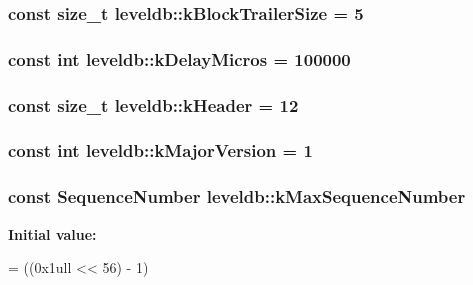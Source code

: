 \subsubsection[{k\+Block\+Trailer\+Size}]{\setlength{\rightskip}{0pt plus 5cm}const size\+\_\+t leveldb\+::k\+Block\+Trailer\+Size = 5\hspace{0.3cm}{\ttfamily [static]}}\label{namespaceleveldb_a4f00b102aae97cb0b0418b6f703a577e}
\hypertarget{namespaceleveldb_a5534e21c4b10affbe7390a9642ac0668}{}
\subsubsection[{k\+Delay\+Micros}]{\setlength{\rightskip}{0pt plus 5cm}const int leveldb\+::k\+Delay\+Micros = 100000\hspace{0.3cm}{\ttfamily [static]}}\label{namespaceleveldb_a5534e21c4b10affbe7390a9642ac0668}
\hypertarget{namespaceleveldb_a0c307b86a9e098703aa8aa0a55ce504a}{}
\subsubsection[{k\+Header}]{\setlength{\rightskip}{0pt plus 5cm}const size\+\_\+t leveldb\+::k\+Header = 12\hspace{0.3cm}{\ttfamily [static]}}\label{namespaceleveldb_a0c307b86a9e098703aa8aa0a55ce504a}
\hypertarget{namespaceleveldb_ab5f58e0e9055bf647e6b92dc8b69c11f}{}
\subsubsection[{k\+Major\+Version}]{\setlength{\rightskip}{0pt plus 5cm}const int leveldb\+::k\+Major\+Version = 1\hspace{0.3cm}{\ttfamily [static]}}\label{namespaceleveldb_ab5f58e0e9055bf647e6b92dc8b69c11f}
\hypertarget{namespaceleveldb_adf59027c8c0dcc54c9d8c3e5ba090463}{}
\subsubsection[{k\+Max\+Sequence\+Number}]{\setlength{\rightskip}{0pt plus 5cm}const {\bf Sequence\+Number} leveldb\+::k\+Max\+Sequence\+Number\hspace{0.3cm}{\ttfamily [static]}}\label{namespaceleveldb_adf59027c8c0dcc54c9d8c3e5ba090463}
{\bfseries Initial value\+:}
\begin{DoxyCode}
=
    ((0x1ull << 56) - 1)
\end{DoxyCode}
\hypertarget{namespaceleveldb_afba0124470c60dd33b9d82838f40fc04}{}
